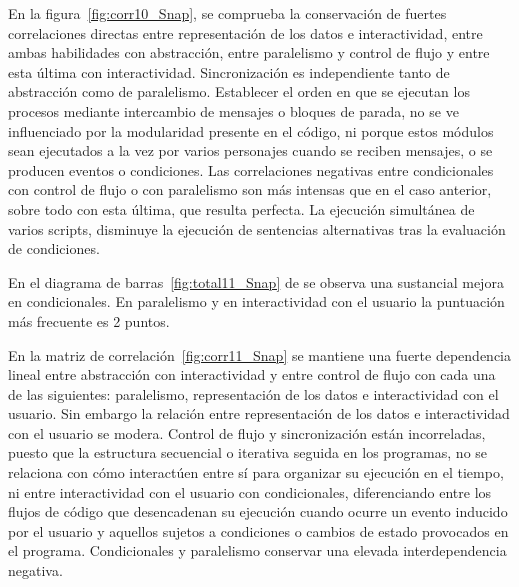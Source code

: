 \documentclass[a4paper, 12pt]{book}
\begin{document}
En la figura~\ref{fig:corr10_Snap}, se comprueba la conservación de fuertes correlaciones directas entre representación de los datos e interactividad, entre ambas habilidades con abstracción, entre paralelismo y control de flujo y entre esta última con interactividad. Sincronización es independiente tanto de abstracción como de paralelismo. Establecer el orden en que se ejecutan los procesos mediante intercambio de mensajes o bloques de parada, no se ve influenciado por la modularidad presente en el código, ni porque estos módulos sean ejecutados a la vez por varios personajes cuando se reciben mensajes, o se producen eventos o condiciones. Las correlaciones negativas entre condicionales con control de flujo o con paralelismo son más intensas que en el caso anterior, sobre todo con esta última, que resulta perfecta. La ejecución simultánea de varios scripts, disminuye la ejecución de sentencias alternativas tras la evaluación de condiciones.

En el diagrama de barras~\ref{fig:total11_Snap} de se observa una sustancial mejora en condicionales. En paralelismo y en interactividad con el usuario la puntuación más frecuente es 2 puntos.

En la matriz de correlación~\ref{fig:corr11_Snap} se mantiene una fuerte dependencia lineal entre abstracción con interactividad y entre control de flujo con cada una de las siguientes: paralelismo, representación de los datos e interactividad con el usuario. Sin embargo la relación entre representación de los datos e interactividad con el usuario se modera. Control de flujo y sincronización están incorreladas, puesto que la estructura secuencial o iterativa seguida en los programas, no se relaciona con cómo interactúen entre sí para organizar su ejecución en el tiempo, ni entre interactividad con el usuario con condicionales, diferenciando entre los flujos de código que desencadenan su ejecución cuando ocurre un evento inducido por el usuario y aquellos sujetos a condiciones o cambios de estado provocados en el programa. Condicionales y paralelismo conservar una elevada interdependencia negativa.
\end{document}
